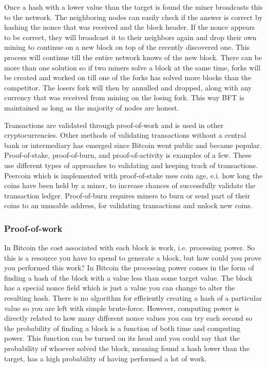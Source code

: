 \documentclass[12pt]{article}
\begin{document}
Once a hash with a lower value than the target is found the miner broadcasts this to the network. The neighboring nodes can easily check if the answer is correct by hashing the nonce that was received and the block header. If the nonce appears to be correct, they will broadcast it to their neighbors again and drop their own mining to continue on a new block on top of the recently discovered one. This process will continue till the entire network knows of the new block. There can be more than one solution so if two miners solve a block at the same time, forks will be created and worked on till one of the forks has solved more blocks than the competitor. The losers fork will then by annulled and dropped, along with any currency that was received from mining on the losing fork. This way BFT is maintained as long as the majority of nodes are honest.

Transactions are validated through proof-of-work and is used in other cryptocurrencies. Other methods of validating transactions without a central bank or intermediary has emerged since Bitcoin went public and became popular. Proof-of-stake, proof-of-burn, and proof-of-activity is examples of a few. These use different types of approaches to validating and keeping track of transactions. Peercoin which is implemented with proof-of-stake uses coin age, e.i. how long the coins have been held by a miner, to increase chances of successfully validate the transaction ledger. Proof-of-burn requires miners to burn or send part of their coins to an unusable address, for validating transactions and unlock new coins. 

\subsubsection{Proof-of-work}\label{subsubsec:proofofwork}

In Bitcoin the cost associated with each block is work, i.e. processing power. So this is a resource you have to spend to generate a block, but how could you prove you performed this work? In Bitcoin the processing power comes in the form of finding a hash of the block with a value less than some target value. The block has a special nonce field which is just a value you can change to alter the resulting hash. There is no algorithm for efficiently creating a hash of a particular value so you are left with simple brute-force. However, computing power is directly related to how many different nonce values you can try each second so the probability of finding a block is a function of both time and computing power. This function can be turned on its head and you could say that the probability of whoever solved the block, meaning found a hash lower than the target, has a high probability of having performed a lot of work.
\end{document}
